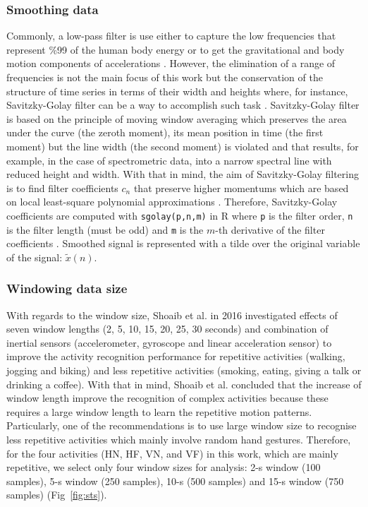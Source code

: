 \documentclass[fleqn,10pt]{wlscirep}
\begin{document}
\subsubsection*{Smoothing data}
Commonly, a low-pass filter is use either to capture the low 
frequencies that represent \%99 of the human body energy or to get 
the gravitational and body motion components of 
accelerations \cite{anguita2013}. However, the elimination of 
a range of frequencies is not the main focus of this work but 
the conservation of the structure of time series in terms of 
their width and heights where, for instance, Savitzky-Golay filter 
can be a way to accomplish such task \cite{press1992}. 
Savitzky-Golay filter is based on the 
principle of moving window averaging which preserves the area under 
the curve (the zeroth moment), its mean position in time 
(the first moment) but the line width (the second moment) is violated 
and that results, for example, in the case of spectrometric data, into
a narrow spectral line with reduced height and width. 
With that in mind, the aim of Savitzky-Golay filtering is to find filter 
coefficients $c_n$ that preserve higher momentums which are based on local 
least-square polynomial approximations \cite{savitzkygolay1964, 
press1992, schafer2011}.
Therefore, Savitzky-Golay coefficients are computed with \texttt{sgolay(p,n,m)} 
in R where \texttt{p} is the filter order, 
\texttt{n} is the filter length (must be odd) and \texttt{m} is the 
$m$-th derivative of the filter coefficients \cite{Rsignal}. 
Smoothed signal is represented with a tilde over the original 
variable of the signal: $\tilde{x}(n)$.

\subsubsection*{Windowing data size}
With regards to the window size, Shoaib et al. in 2016 \cite{shoaib2016} 
investigated effects of seven window lengths (2, 5, 10, 15, 20, 25, 30 seconds)
and combination of inertial sensors (accelerometer, gyroscope and linear 
acceleration sensor) to improve the activity recognition performance for 
repetitive activities (walking, jogging and biking) and less repetitive 
activities (smoking, eating, giving a talk or drinking a coffee).
With that in mind, Shoaib et al. \cite{shoaib2016} concluded that the 
increase of window length improve the recognition of complex activities 
because these requires a large window length to learn the repetitive 
motion patterns. Particularly, one of the recommendations is to use large 
window size to recognise less repetitive activities which mainly involve 
random hand gestures. Therefore, for the four activities 
(HN, HF, VN, and VF) in this work, which are mainly repetitive, 
we select only four window sizes for analysis: 2-s window (100 samples), 
5-s window (250 samples), 10-s (500 samples) and 15-s window (750 samples) 
(Fig~\ref{fig:sts}).
\end{document}
